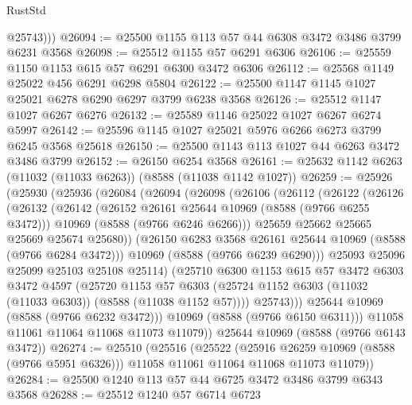 \begin{lexlean}{RustStd}
\begin{coremodule}
          @25743)))
@26094 := @25500 @1155 @113 @57 @44 @6308 @3472 @3486 @3799 @6231 @3568
@26098 := @25512 @1155 @57 @6291 @6306
@26106 := @25559 @1150 @1153 @615 @57 @6291 @6300 @3472 @6306
@26112 := @25568 @1149 @25022 @456 @6291 @6298 @5804
@26122 := @25500 @1147 @1145 @1027 @25021 @6278 @6290 @6297 @3799 @6238 @3568
@26126 := @25512 @1147 @1027 @6267 @6276
@26132 := @25589 @1146 @25022 @1027 @6267 @6274 @5997
@26142 := @25596 @1145 @1027 @25021 @5976 @6266 @6273 @3799 @6245 @3568 @25618
@26150 := @25500 @1143 @113 @1027 @44 @6263 @3472 @3486 @3799
@26152 := @26150 @6254 @3568
@26161 := @25632 @1142 @6263 (@11032 (@11033 @6263)) (@8588 (@11038 @1142 @1027))
@26259 := @25926
    (@25930
      (@25936
        (@26084
          (@26094
            (@26098
              (@26106
                (@26112
                  (@26122
                    (@26126
                      (@26132
                        (@26142
                          (@26152 @26161 @25644 @10969 (@8588 (@9766 @6255 @3472)))
                          @10969
                          (@8588 (@9766 @6246 @6266)))
                        @25659
                        @25662
                        @25665
                        @25669
                        @25674
                        @25680))
                    (@26150 @6283 @3568 @26161 @25644 @10969 (@8588 (@9766 @6284 @3472)))
                    @10969
                    (@8588 (@9766 @6239 @6290)))
                  @25093
                  @25096
                  @25099
                  @25103
                  @25108
                  @25114)
                (@25710
                  @6300
                  @1153
                  @615
                  @57
                  @3472
                  @6303
                  @3472
                  @4597
                  (@25720
                    @1153
                    @57
                    @6303
                    (@25724 @1152 @6303 (@11032 (@11033 @6303)) (@8588 (@11038 @1152 @57))))
                  @25743)))
            @25644
            @10969
            (@8588 (@9766 @6232 @3472)))
          @10969
          (@8588 (@9766 @6150 @6311)))
        @11058
        @11061
        @11064
        @11068
        @11073
        @11079))
    @25644
    @10969
    (@8588 (@9766 @6143 @3472))
@26274 := @25510
    (@25516
      (@25522
        (@25916 @26259 @10969 (@8588 (@9766 @5951 @6326)))
        @11058
        @11061
        @11064
        @11068
        @11073
        @11079))
@26284 := @25500 @1240 @113 @57 @44 @6725 @3472 @3486 @3799 @6343 @3568
@26288 := @25512 @1240 @57 @6714 @6723

\end{coremodule}
\end{lexlean}
